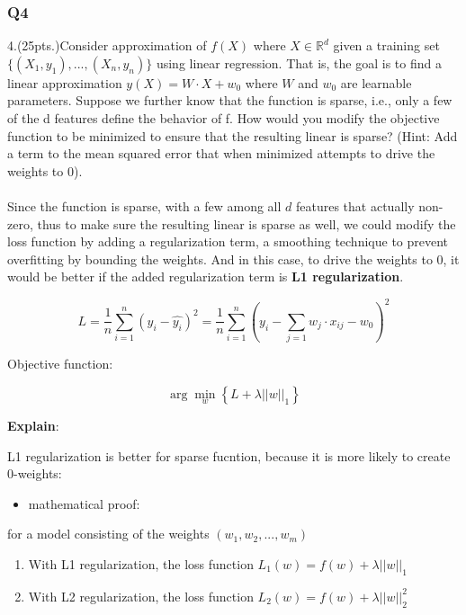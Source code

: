 \documentclass[11pt]{article}
\providecommand{\tightlist}{%
      \setlength{\itemsep}{0pt}\setlength{\parskip}{0pt}}
\begin{document}
    \subsubsection*{Q4}\label{q4}

    4.(25pts.)Consider approximation of \(f(X)\) where
\(X \in \mathbb{R}^d\) given a training set
\(\{(X_1, y_1), ..., (X_n, y_n)\}\) using linear regression. That is,
the goal is to find a linear approximation \(y(X) = W \cdot X + w_0\)
where \(W\) and \(w_0\) are learnable parameters. Suppose we further
know that the function is sparse, i.e., only a few of the d features
define the behavior of f. How would you modify the objective function to
be minimized to ensure that the resulting linear is sparse? (Hint: Add a
term to the mean squared error that when minimized attempts to drive the
weights to 0).\\\\

\noindent    Since the function is sparse, with a few among all \(d\) features that
actually non-zero, thus to make sure the resulting linear is sparse as
well, we could modify the loss function by adding a regularization term,
a smoothing technique to prevent overfitting by bounding the weights.
And in this case, to drive the weights to 0, it would be better if the
added regularization term is \textbf{L1 regularization}.

\[L = \frac{1}{n} \sum^n_{i=1} (y_i - \hat {y_i})^2 = \frac{1}{n} \sum^n_{i=1} (y_i - \sum_{j=1}w_j \cdot x_{ij} -w_0)^2\]

\noindent Objective function:

\[\arg \min _w \left \{ L + \lambda ||w||_1 \right \}\]

\noindent \textbf{Explain}:

 L1 regularization is better for sparse fucntion, because it is
more likely to create 0-weights:


\begin{itemize}
\tightlist
\item
  mathematical proof:
\end{itemize}

for a model consisting of the weights \((w_1,w_2,...,w_m)\)

\begin{enumerate}
\def\labelenumi{\arabic{enumi}.}
\item
  With L1 regularization, the loss function
  \(L_1(w) = f(w) + \lambda||w||_1\)
\item
  With L2 regularization, the loss function
  \(L_2(w) = f(w) +\lambda ||w||^2_2\)
\end{enumerate}
\end{document}

